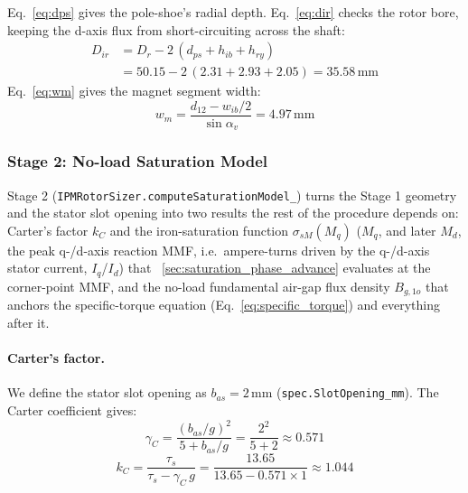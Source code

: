 \documentclass[10pt,final,journal,a4paper,oneside,twocolumn]{IEEEtran}
\begin{document}
Eq.~\ref{eq:dps} gives the pole-shoe's radial depth. Eq.~\ref{eq:dir} checks the rotor bore, keeping the d-axis flux from short-circuiting across the shaft:
\begin{equation}
    \label{eq:dir}
    \begin{split}
    D_{ir} &= D_r - 2\,(d_{ps}+h_{ib}+h_{ry}) \\
    &= 50.15-2\,(2.31+2.93+2.05) = 35.58\,\text{mm}
    \end{split}
\end{equation}
Eq.~\ref{eq:wm} gives the magnet segment width:
\begin{equation}
    \label{eq:wm}
    w_m = \frac{d_{12}-w_{ib}/2}{\sin\alpha_v} = 4.97\,\text{mm}
\end{equation}

\subsubsection{Stage 2: No-load Saturation Model}
\label{sec:stage2_saturation}
Stage 2 (\texttt{IPMRotorSizer.computeSaturationModel\_}) turns the Stage 1 geometry and the stator slot opening into two results the rest of the procedure depends on: Carter's factor $k_C$ and the iron-saturation function $\sigma_{sM}(M_q)$ ($M_q$, and later $M_d$, the peak q-/d-axis reaction MMF, i.e.\ ampere-turns driven by the q-/d-axis stator current, $I_q$/$I_d$) that \sectionname~\ref{sec:saturation_phase_advance} evaluates at the corner-point MMF, and the no-load fundamental air-gap flux density $B_{g,1o}$ that anchors the specific-torque equation (Eq.~\ref{eq:specific_torque}) and everything after it.

\paragraph{Carter's factor.} We define the stator slot opening as $b_{as}=2\,\text{mm}$ (\texttt{spec.SlotOpening\_mm}). The Carter coefficient gives:
\begin{equation}
    \label{eq:carter_gamma}
    \gamma_C = \frac{(b_{as}/g)^2}{5+b_{as}/g} = \frac{2^2}{5+2} \approx 0.571
\end{equation}
\begin{equation}
    \label{eq:carter_factor}
    k_C = \frac{\tau_s}{\tau_s-\gamma_C\,g} = \frac{13.65}{13.65-0.571\times1} \approx 1.044
\end{equation}
\end{document}
